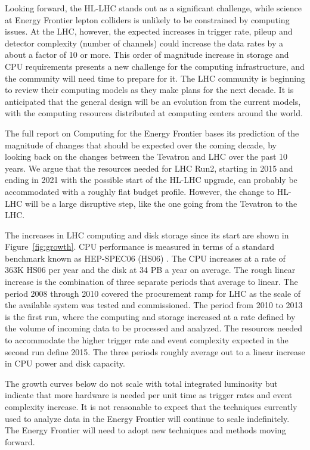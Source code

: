 Looking forward, the HL-LHC stands out as a significant challenge, while
science at Energy Frontier lepton colliders is unlikely to be constrained by computing
issues.  At the LHC, however, the expected increases in trigger rate, pileup
and detector complexity (number of channels) could increase the data rates by
a about a factor of 10 or more.   This order of magnitude increase in storage
and CPU requirements presents a new challenge for the computing infrastructure,
and the community will need time to prepare for it. The LHC community is
beginning to review their computing models as they make plans for the next
decade.  It is anticipated that the general design will be an evolution from
the current models, with the computing resources distributed at computing
centers around the world.

The full report on Computing for the Energy Frontier bases its  prediction of the magnitude
of changes that should be expected over the coming decade, by looking back
on  the changes between the Tevatron and LHC over the past 10 years. We argue
that the resources needed for LHC Run2, starting in 2015 and ending
in 2021 with the possible start of  the HL-LHC upgrade, can probably be
accommodated with a roughly flat budget profile. However, the change to HL-LHC
will be a large disruptive step, like the one going from the Tevatron to the
LHC.

The increases in LHC computing and disk storage since its start are shown in
Figure~\ref{fig:growth}.  CPU performance is measured in terms of a standard
benchmark known as HEP-SPEC06 (HS06) \cite{HS06}.
The CPU increases at a rate of 363K HS06 per year and
the disk at 34 PB a year on average.  The rough linear increase is the
combination of three separate periods that average to linear.  The period
2008 through 2010 covered the procurement ramp for LHC as the scale of the
available system was tested and commissioned. The period from 2010 to 2013 is
the first run, where the computing and storage increased at a rate defined
by the volume of incoming data to be processed and analyzed.
The resources needed to accommodate
the higher trigger rate and event complexity expected in the second run define
2015.  The three periods roughly average out to a linear increase in
CPU power and disk capacity.

The growth curves below do not scale with total integrated luminosity but
indicate that more hardware is needed per unit time as trigger rates and event
complexity increase. It is not reasonable to expect that the techniques
currently used to analyze data in the Energy Frontier will continue to scale indefinitely.
The Energy Frontier will need to adopt new techniques and methods moving forward.

